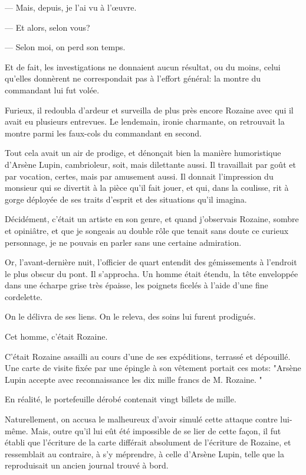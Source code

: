 \documentclass[12pt,a4paper]{book}
\begin{document}
— Mais, depuis, je l’ai vu à l’œuvre.

— Et alors, selon vous?

— Selon moi, on perd son temps.

Et de fait, les investigations ne donnaient aucun résultat, ou du moins, celui qu’elles donnèrent ne correspondait pas à l’effort général: la montre du commandant lui fut volée.

Furieux, il redoubla d’ardeur et surveilla de plus près encore Rozaine avec qui il avait eu plusieurs entrevues. Le lendemain, ironie charmante, on retrouvait la montre parmi les faux-cols du commandant en second.

Tout cela avait un air de prodige, et dénonçait bien la manière humoristique d’Arsène Lupin, cambrioleur, soit, mais dilettante aussi. Il travaillait par goût et par vocation, certes, mais par amusement aussi. Il donnait l’impression du monsieur qui se divertit à la pièce qu’il fait jouer, et qui, dans la coulisse, rit à gorge déployée de ses traits d’esprit et des situations qu’il imagina.

Décidément, c’était un artiste en son genre, et quand j’observais Rozaine, sombre et opiniâtre, et que je songeais au double rôle que tenait sans doute ce curieux personnage, je ne pouvais en parler sans une certaine admiration.

Or, l’avant-dernière nuit, l’officier de quart entendit des gémissements à l’endroit le plus obscur du pont. Il s’approcha. Un homme était étendu, la tête enveloppée dans une écharpe grise très épaisse, les poignets ficelés à l’aide d’une fine cordelette.

On le délivra de ses liens. On le releva, des soins lui furent prodigués.

Cet homme, c’était Rozaine.

C’était Rozaine assailli au cours d’une de ses expéditions, terrassé et dépouillé. Une carte de visite fixée par une épingle à son vêtement portait ces mots: "Arsène Lupin accepte avec reconnaissance les dix mille francs de M. Rozaine. "

En réalité, le portefeuille dérobé contenait vingt billets de mille.

Naturellement, on accusa le malheureux d’avoir simulé cette attaque contre lui-même. Mais, outre qu’il lui eût été impossible de se lier de cette façon, il fut établi que l’écriture de la carte différait absolument de l’écriture de Rozaine, et ressemblait au contraire, à s’y méprendre, à celle d’Arsène Lupin, telle que la reproduisait un ancien journal trouvé à bord.
\end{document}
